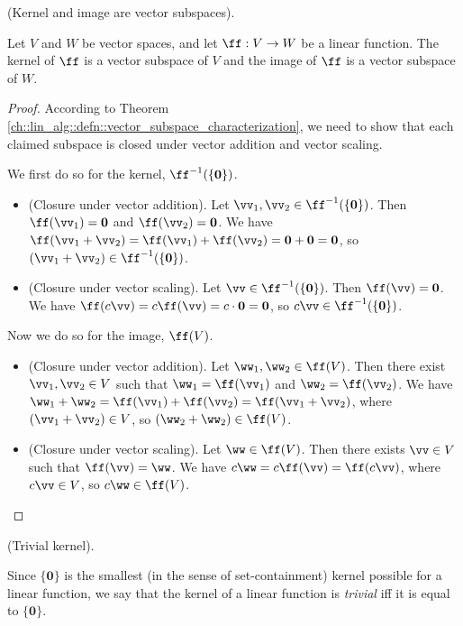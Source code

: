 \begin{theorem}
    (Kernel and image are vector subspaces). 
    
    Let $V$ and $W$ be vector spaces, and let $\ff:V \rightarrow W$ be a linear function. The kernel of $\ff$ is a vector subspace of $V$ and the image of $\ff$ is a vector subspace of $W$.
\end{theorem}

\begin{proof}
    According to Theorem \ref{ch::lin_alg::defn::vector_subspace_characterization}, we need to show that each claimed subspace is closed under vector addition and vector scaling.

    We first do so for the kernel, $\ff^{-1}(\{\mathbf{0}\})$.
    \begin{itemize}
        \item (Closure under vector addition). Let $\vv_1, \vv_2 \in \ff^{-1}(\{\mathbf{0}\})$. Then $\ff(\vv_1) = \mathbf{0}$ and $\ff(\vv_2) = \mathbf{0}$. We have $\ff(\vv_1 + \vv_2) =\ff(\vv_1) + \ff(\vv_2) = \mathbf{0} + \mathbf{0} = \mathbf{0}$, so $(\vv_1 + \vv_2) \in \ff^{-1}(\{\mathbf{0}\})$.        
        \item (Closure under vector scaling). Let $\vv \in \ff^{-1}(\{\mathbf{0}\})$. Then $\ff(\vv) = \mathbf{0}$. We have $\ff(c\vv) = c\ff(\vv) = c\cdot \mathbf{0} = \mathbf{0}$, so $c\vv \in \ff^{-1}(\{\mathbf{0}\})$.
    \end{itemize}

    Now we do so for the image, $\ff(V)$.
    \begin{itemize}
        \item (Closure under vector addition). Let $\ww_1, \ww_2 \in \ff(V)$. Then there exist $\vv_1, \vv_2 \in V$ such that $\ww_1 = \ff(\vv_1)$ and $\ww_2 = \ff(\vv_2)$. We have $\ww_1 + \ww_2 = \ff(\vv_1) + \ff(\vv_2) = \ff(\vv_1 + \vv_2)$, where $(\vv_1 + \vv_2) \in V$, so $(\ww_2 + \ww_2) \in \ff(V)$.
        \item (Closure under vector scaling). Let $\ww \in \ff(V)$. Then there exists $\vv \in V$ such that $\ff(\vv) = \ww$. We have $c\ww = c\ff(\vv) = \ff(c\vv)$, where $c\vv \in V$, so $c\ww \in \ff(V)$.
    \end{itemize}
\end{proof}

\begin{defn}
    (Trivial kernel).
    
    Since $\{\mathbf{0}\}$ is the smallest (in the sense of set-containment) kernel possible for a linear function, we say that the kernel of a linear function is \textit{trivial} iff it is equal to $\{\mathbf{0}\}$.
\end{defn}

